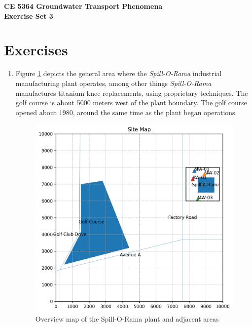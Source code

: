 \documentclass[12pt]{article}
\begin{document}
\begin{center}
{\textbf{{ CE 5364 Groundwater Transport Phenomena } \\ {Exercise Set 3}}}
\end{center}

\section*{\small{Exercises}}
\begin{enumerate} %


\item Figure \ref{fig:site_map_homework1} depicts the general area where the \textsl{Spill-O-Rama} industrial manufacturing plant operates, among other things \textsl{Spill-O-Rama} manufactures titanium knee replacements, using proprietary techniques. The golf course is about 5000 meters west of the plant boundary. The golf course opened about 1980, around the same time as the plant began operations. 

\begin{figure}[h!] %
   \centering
   \includegraphics[width=6in]{site_map_homework1.png} 
   \caption{Overview map of the Spill-O-Rama plant and adjacent areas}
   \label{fig:site_map_homework1}
\end{figure}


\end{enumerate}
\end{document}
